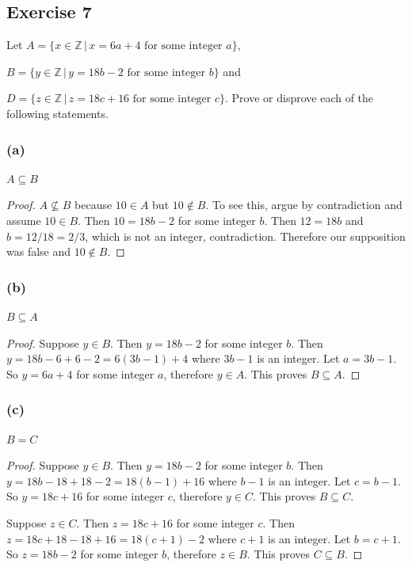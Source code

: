 \documentclass[14pt]{extarticle}
\newcommand{\Z}{\mathbb{Z}}
\begin{document}
\subsection{Exercise 7}
Let \(A = \{x \in \Z \, | \, x = 6a+4 \text{ for some integer } a\}\), 

\(B = \{y \in \Z \, | \, y = 18b-2 \text{ 
for some integer } b\}\) and 

\(D = \{z \in \Z \, | \, z = 18c+16 \text{ for some integer } c\}\). 
Prove or disprove each of the following statements.

\subsubsection{(a)}
\(A \subseteq B\)

\begin{proof}
\(A \nsubseteq B\) because $10 \in A$ but $10 \notin B$. To see this, argue by contradiction and assume $10 \in B$.
Then \(10 = 18b-2\) for some integer $b$. Then \(12 = 18b\) and \(b = 12/18 = 2/3\), which is not an integer,
contradiction. Therefore our supposition was false and $10 \notin B$.
\end{proof}

\subsubsection{(b)}
\(B \subseteq A\)

\begin{proof}
Suppose $y \in B$. Then \(y = 18b-2\) for some integer $b$. Then \(y = 18b-6+6-2 = 6(3b-1) + 4\) where $3b-1$ is an 
integer. Let $a = 3b-1$. So \(y = 6a + 4\) for some integer $a$, therefore $y \in A$. This proves \(B \subseteq A\).
\end{proof}

\subsubsection{(c)}
$B = C$

\begin{proof}
Suppose $y \in B$. Then \(y = 18b-2\) for some integer $b$. Then \(y = 18b-18+18-2 = 18(b-1) + 16\) where $b-1$ is an 
integer. Let $c = b-1$. So \(y = 18c + 16\) for some integer $c$, therefore $y \in C$. This proves \(B \subseteq C\).

Suppose $z \in C$. Then \(z = 18c+16\) for some integer $c$. Then \(z = 18c+18-18+16 = 18(c+1) -2\) where $c+1$ is an integer. Let $b = c+1$. So \(z = 18b -2\) for some integer $b$, therefore $z \in B$. This proves \(C \subseteq B\).
\end{proof}
\end{document}
